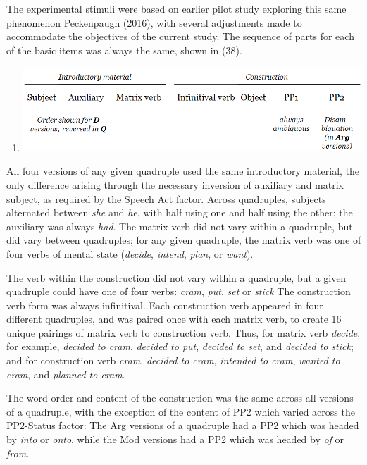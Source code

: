\documentclass[12pt,oneside]{book}
\providecommand{\tightlist}{%
  \setlength{\itemsep}{0pt}\setlength{\parskip}{0pt}}
\begin{document}
The experimental stimuli were based on earlier pilot study exploring this same phenomenon Peckenpaugh (2016), with several adjustments made to accommodate the objectives of the current study. The sequence of parts for each of the basic items was always the same, shown in (38).

\begin{enumerate}
\def\labelenumi{(\arabic{enumi})}
\setcounter{enumi}{37}
\tightlist
\item
  \includegraphics{item_diagram.png}
\end{enumerate}

All four versions of any given quadruple used the same introductory material, the only difference arising through the necessary inversion of auxiliary and matrix subject, as required by the Speech Act factor. Across quadruples, subjects alternated between \emph{she} and \emph{he}, with half using one and half using the other; the auxiliary was always \emph{had}. The matrix verb did not vary within a quadruple, but did vary between quadruples; for any given quadruple, the matrix verb was one of four verbs of mental state (\emph{decide}, \emph{intend}, \emph{plan}, or \emph{want}).

The verb within the construction did not vary within a quadruple, but a given quadruple could have one of four verbs: \emph{cram}, \emph{put}, \emph{set} or \emph{stick} The construction verb form was always infinitival. Each construction verb appeared in four different quadruples, and was paired once with each matrix verb, to create 16 unique pairings of matrix verb to construction verb. Thus, for matrix verb \emph{decide}, for example, \emph{decided to cram}, \emph{decided to put}, \emph{decided to set}, and \emph{decided to stick}; and for construction verb \emph{cram}, \emph{decided to cram}, \emph{intended to cram}, \emph{wanted to cram}, and \emph{planned to cram}.

The word order and content of the construction was the same across all versions of a quadruple, with the exception of the content of PP2 which varied across the PP2-Status factor: The Arg versions of a quadruple had a PP2 which was headed by \emph{into} or \emph{onto}, while the Mod versions had a PP2 which was headed by \emph{of} or \emph{from.}
\end{document}
